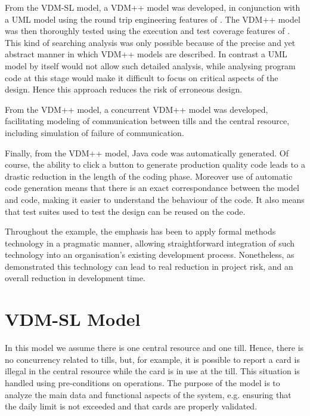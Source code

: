 \documentclass[\pformat,12pt,twoside]{article}
\begin{document}
 From the VDM-SL model, a VDM++ model was developed, in conjunction
with a UML model using the round trip engineering features of
\vdmtools. The VDM++ model was then thoroughly tested using the
execution and test coverage features of \vdmtools. This kind of
searching analysis was only possible because of the precise and yet
abstract manner in which VDM++ models are described. In contrast a UML
model by itself would not allow such detailed analysis, while
analysing program code at this stage would make it difficult to focus
on critical aspects of the design. Hence this approach reduces the
risk of erroneous design.

 From the VDM++ model, a concurrent VDM++ model was developed,
facilitating modeling of communication between tills and the central
resource, including simulation of failure of communication.

Finally, from the VDM++ model, Java code was automatically
generated. Of course, the ability to click a button to generate
production quality code leads to a drastic reduction in the length of
the coding phase. Moreover use of automatic code generation means that
there is an exact correspondance between the model and code, making it
easier to understand the behaviour of the code. It also means that
test suites used to test the design can be reused on the code.

Throughout the example, the emphasis has been to apply formal methods
technology in a pragmatic manner, allowing straightforward integration
of such technology into an organisation's existing development
process. Nonetheless, as demonstrated this technology can lead to real
reduction in project risk, and an overall reduction in development
time. 





\appendix

\newpage
\section{VDM-SL Model}\label{app:VDMSL}

In this model we assume there is one central resource and one 
till. Hence, there is no concurrency related to tills, but, for 
example, it is possible to report a card is illegal in the central 
resource while the card is in use at the till. This situation is 
handled using pre-conditions on operations. The purpose of the 
model is to analyze the main data and functional aspects of the 
system, e.g. ensuring that the daily limit is not exceeded and 
that cards are properly validated. 
\end{document}
